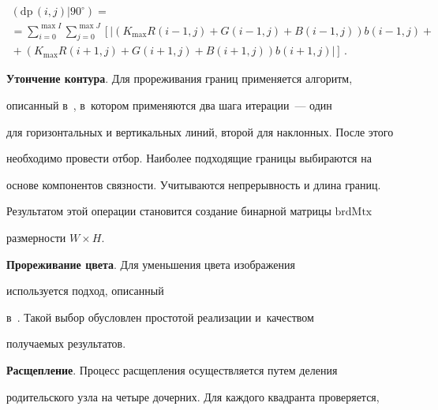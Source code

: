   

  \vspace*{-12pt}

  

  \noindent

  \begin{multline*}

    \left( \mathrm{dp}\,(i,j)\vert 90^\circ \right) ={}\\

    {}=\sum\limits_{i=0}^{\max I} 

\sum\limits_{j=0}^{\max J}\left[ \left\vert

  \left( K_{\max} R(i-1,j) +G(i-1,j) +B(i-1,j) \right) %

  b(i-1,j)+{}\right.\right.\\

\left.\left.  {}+\left( K_{\max} R(i+1,j)+ 

G(i+1,j)+B(i+1,j)\right) %

b(i+1,j)\right\vert \right]\,.

  \end{multline*}

  

  \textbf{Утончение контура}. Для прореживания границ применяется алгоритм, 

описанный в~\cite{12-sor}, в~котором применяются два шага итерации~--- один 

для горизонтальных и вертикальных линий, второй для наклонных. После этого 

необходимо провести отбор. Наиболее подходящие границы выбираются на 

основе компонентов связности. Учитываются непрерывность и длина границ. 

Результатом этой операции становится создание бинарной матрицы $\mathrm{brdMtx}$ 

размерности $W\times H$.

   

  \textbf{Прореживание цвета}. Для уменьшения цвета изображения 

используется подход, описанный  

в~\cite{13-sor}. Такой выбор обусловлен простотой реализации и~качеством 

получаемых результатов.

  

  \textbf{Расщепление}. Процесс расщепления осуществляется путем деления 

родительского узла на четыре дочерних. Для каждого квадранта проверяется, 

